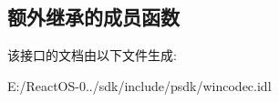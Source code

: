 \subsection*{额外继承的成员函数}


该接口的文档由以下文件生成\+:\begin{DoxyCompactItemize}
\item 
E\+:/\+React\+O\+S-\/0../sdk/include/psdk/wincodec.\+idl\end{DoxyCompactItemize}
